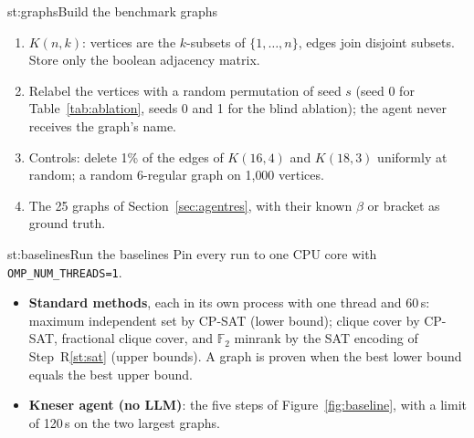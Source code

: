 \begin{step}{st:graphs}{Build the benchmark graphs}
\begin{enumerate}
  \item $K(n,k)$: vertices are the $k$-subsets of $\{1,\dots,n\}$, edges join disjoint subsets. Store only the
  boolean adjacency matrix.
  \item Relabel the vertices with a random permutation of seed $s$ (seed 0 for Table~\ref{tab:ablation}, seeds 0 and
  1 for the blind ablation); the agent never receives the graph's name.
  \item Controls: delete 1\% of the edges of $K(16,4)$ and $K(18,3)$ uniformly at random; a random 6-regular graph on
  1{,}000 vertices.
  \item The 25 graphs of Section~\ref{sec:agentres}, with their known $\beta$ or bracket as ground truth.
\end{enumerate}
\end{step}

\begin{step}{st:baselines}{Run the baselines}
Pin every run to one CPU core with \texttt{OMP\_NUM\_THREADS=1}.
\begin{itemize}
  \item \textbf{Standard methods}, each in its own process with one thread and 60\,s: maximum independent set by
  CP-SAT (lower bound); clique cover by CP-SAT, fractional clique cover, and $\mathbb{F}_2$ minrank by the SAT encoding
  of Step~R\ref{st:sat} (upper bounds). A graph is proven when the best lower bound equals the best upper bound.
  \item \textbf{Kneser agent (no LLM)}: the five steps of Figure~\ref{fig:baseline}, with a limit of 120\,s on the two
  largest graphs.
\end{itemize}
\end{step}

